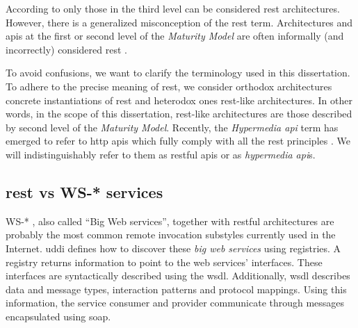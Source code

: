 According to \citet{fielding_architectural_2000} only those in the third level can be considered \ac{rest} architectures.
However, there is a generalized misconception of the \ac{rest} term.
Architectures and \ac{api}s at the first or second level of the \emph{\citeauthor{richardson_introducing_2008} Maturity Model} are often informally (and incorrectly) considered \ac{rest} \citep{fielding_rest_2008,moore_hypermedia_2010,klabnik_nobody_2011}.


To avoid confusions, we want to clarify the terminology used in this dissertation.
To adhere to the precise meaning of \ac{rest}, we consider orthodox architectures concrete instantiations of \ac{rest} and heterodox ones \ac{rest}-like architectures.
In other words, in the scope of this dissertation, \ac{rest}-like architectures are those described by second level of the \emph{\citeauthor{richardson_introducing_2008} Maturity Model}.
Recently, the \emph{Hypermedia \ac{api}} term has emerged to refer to \acs{http} \ac{api}s which fully comply with all the \ac{rest} principles \citep{klabnik_rest_2012,moore_hypermedia_2010,amundsen_building_2011}.  %
We will indistinguishably refer to them as \ac{rest}ful \ac{api}s or as \emph{hypermedia \ac{api}}s.



\subsection{\acs{rest} vs WS-* services}
\label{sec:rest_ws}

WS-* \citep{newcomer_understanding_2002,alonso_web_2010}, also called ``Big Web services'', together with \acs{rest}ful architectures are probably the most common remote invocation substyles currently used in the Internet.
\ac{uddi} defines how to discover these \emph{big web services} using registries.
A registry returns information to point to the web services' interfaces.
These interfaces are syntactically described using the \ac{wsdl}.
Additionally, \ac{wsdl} describes data and message types, interaction patterns and protocol mappings.
Using this information, the service consumer and provider communicate through messages encapsulated using \ac{soap}.


